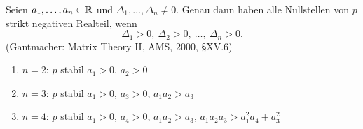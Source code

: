 \documentclass[a4paper,twoside,DIV15,BCOR12mm]{scrbook}
\begin{document}
\begin{thm}\label{thm3.20}
  Seien $a_1,\dotsc,a_n\in\mathbb{R}$ und $\Delta_1,\dotsc,\Delta_n\neq0$. Genau dann haben alle Nullstellen von $p$ strikt negativen
  Realteil, wenn
  \begin{equation}\label{3.6}
    \Delta_1>0,\ \Delta_2>0,\ \dotsc,\ \Delta_n>0.
  \end{equation}
  (Gantmacher: Matrix Theory II, AMS, 2000, §XV.6)
\end{thm}
\begin{bsp*}
  \begin{enumerate}
  \item $n=2$: $p$ stabil \gdw $a_1>0$, $a_2>0$
  \item $n=3$: $p$ stabil \gdw $a_1>0$, $a_3>0$, $a_1a_2>a_3$
  \item $n=4$: $p$ stabil \gdw $a_1>0$, $a_4>0$, $a_1a_2>a_3$, $a_1a_2a_3>a_1^2a_4+a_3^2$
  \end{enumerate}
\end{bsp*}
\end{document}
